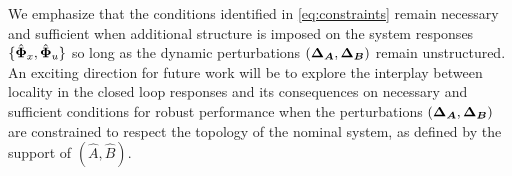 We emphasize that the conditions identified in \eqref{eq:constraints} remain necessary and sufficient when additional structure is imposed on the system responses $\{\hat{\boldsymbol{\Phi}}_x,\hat{\boldsymbol{\Phi}}_u\}$ so long as the dynamic perturbations $({\boldsymbol{\Delta}}_{\boldsymbol{A}},{\boldsymbol{\Delta}}_{\boldsymbol{B}})$ remain unstructured.  An exciting direction for future work will be to explore the interplay between locality in the closed loop responses and its consequences on necessary and sufficient conditions for robust performance when the perturbations $({\boldsymbol{\Delta}}_{\boldsymbol{A}},{\boldsymbol{\Delta}}_{\boldsymbol{B}})$ are constrained to respect the topology of the nominal system, as defined by the support of $(\hat A, \hat B)$.
%
